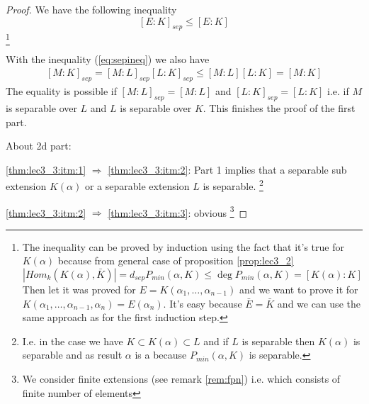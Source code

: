 \begin{theorem}
\begin{proof}
    We have the following inequality
    \begin{equation}
      \left[E:K\right]_{sep} \le \left[E:K\right]
      \label{eq:sepineq}
    \end{equation}
    \footnote{
      The inequality can be proved by induction using the fact that
      it's true for $K\left(\alpha\right)$ because from general case
      of proposition \ref{prop:lec3_2} 
      \[
      \left|Hom_k\left(K\left(\alpha\right), \bar{K}\right)\right| =
      d_{sep} P_{min}\left(\alpha, K\right) \le
      \deg P_{min}\left(\alpha, K\right) =
      \left[K\left(\alpha\right): K \right]
      \]
      Then let it was proved for $E = K\left(\alpha_1, \dots,
      \alpha_{n-1}\right)$ and we want to prove it for
      $K\left(\alpha_1, \dots,
      \alpha_{n-1}, \alpha_n\right) = E\left(\alpha_n\right)$.
      It's easy because $\bar{E} = \bar{K}$  and we can use the same
      approach as for the first induction step.
    }

    With the inequality (\ref{eq:sepineq}) we also have
    \begin{eqnarray}
    \left[M:K\right]_{sep} = 
    \left[M:L\right]_{sep} \left[L:K\right]_{sep} \le
    \left[M:L\right] \left[L:K\right] = \left[M:K\right]
    \nonumber
    \end{eqnarray}
    The equality is possible if
    $\left[M:L\right]_{sep} = \left[M:L\right]$ and 
    $\left[L:K\right]_{sep} = \left[L:K\right]$ i.e. if
    $M$ is separable over $L$ and $L$ is
    separable over $K$.
    This finishes the proof of the first part.
    
    About 2d part:

    \ref{thm:lec3_3:itm:1} $\Rightarrow$ \ref{thm:lec3_3:itm:2}:
    Part 1 implies that a separable sub extension
    $K\left(\alpha\right)$ or a separable extension $L$ is separable.
    \footnote{
      I.e. in the case we have $K \subset K\left(\alpha\right) \subset
      L$ and if $L$ is separable then $K\left(\alpha\right)$ is
      separable and as result $\alpha$ is a
       because $P_{min}\left(\alpha, K\right)$
      is separable.
    }
    
    \ref{thm:lec3_3:itm:2} $\Rightarrow$ \ref{thm:lec3_3:itm:3}:
    obvious
    \footnote{
      We consider finite extensions (see remark \ref{rem:fpn})
      i.e. which consists of finite number of elements
    }


\end{proof}
\end{theorem}
